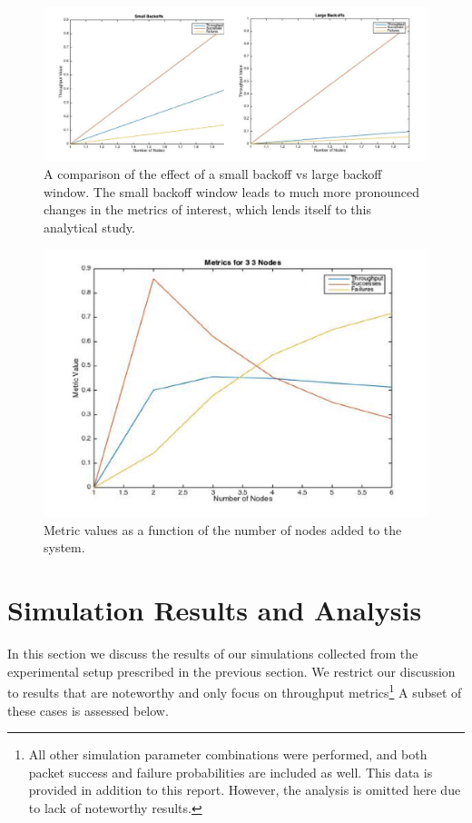 \documentclass{llncs}
\begin{document}
\begin{figure}
\begin{center}
\includegraphics[scale=0.6]{smallwindow.png}
\caption{A comparison of the effect of a small backoff vs large backoff window. The small backoff window leads to much more pronounced changes in the metrics of interest, which lends itself to this analytical study.}
\label{fig:smallwindow}
\end{center}
\end{figure}

\begin{figure}
\begin{center}
\includegraphics[scale=0.6]{multinodes.png}
\caption{Metric values as a function of the number of nodes added to the system.}
\label{fig:multinodes}
\end{center}
\end{figure}

\section{Simulation Results and Analysis}
In this section we discuss the results of our simulations collected from the experimental setup prescribed in the previous section. We restrict our discussion to results that are noteworthy and only focus on throughput metrics\footnote{All other simulation parameter combinations were performed, and both packet success and failure probabilities are included as well. This data is provided in addition to this report. However, the analysis is omitted here due to lack of noteworthy results.} A subset of these cases is assessed below.
\end{document}
